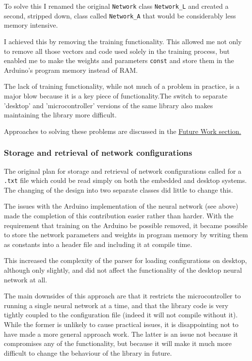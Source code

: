 \documentclass[a4paper]{article}
\begin{document}
To solve this I renamed the original \lstinline{Network} class \lstinline{Network_L} and created a second, stripped down, class called \lstinline{Network_A} that would be considerably less memory intensive.

I achieved this by removing the training functionality. This allowed me not only to remove all those vectors and code used solely in the training process, but enabled me to make the weights and parameters \lstinline{const} and store them in the Arduino's program memory instead of RAM. 

The lack of training functionality, while not much of a problem in practice, is a major blow because it is a key piece of functionality.The switch to separate 'desktop' and 'microcontroller' versions of the same library also makes maintaining the library more difficult.

Approaches to solving these problems are discussed in the \hyperref[subsec:fw_futurework]{Future Work section.}

\subsubsection{Storage and retrieval of network configurations}

The original plan for storage and retrieval of network configurations called for a \lstinline{.txt} file which could be read simply on both the embedded and desktop systems. The changing of the design into two separate classes did little to change this.

The issues with the Arduino implementation of the neural network (see above) made the completion of this contribution easier rather than harder. With the requirement that training on the Arduino be possible removed, it became possible to store the network parameters and weights in program memory by writing them as constants into a header file and including it at compile time. 

This increased the complexity of the parser for loading configurations on desktop, although only slightly, and did not affect the functionality of the desktop neural network at all.

The main downsides of this approach are that it restricts the microcontroller to running a single neural network at a time, and that the library code is very tightly coupled to the configuration file (indeed it will not compile without it). While the former is unlikely to cause practical issues, it is disappointing not to have made a more general approach work.
The latter is an issue not because it compromises any of the functionality, but because it will make it much more difficult to change the behaviour of the library in future. 
\end{document}
